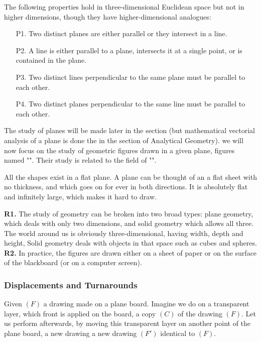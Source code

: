 	The following properties hold in three-dimensional Euclidean space but not in higher dimensions, though they have higher-dimensional analogues:
	\begin{enumerate}
		\item[P1.] Two distinct planes are either parallel or they intersect in a line.
		\item[P2.] A line is either parallel to a plane, intersects it at a single point, or is contained in the plane.
		\item[P3.] Two distinct lines perpendicular to the same plane must be parallel to each other.
		\item[P4.] Two distinct planes perpendicular to the same line must be parallel to each other.
	\end{enumerate}
	
	The study of planes will be made later in the section (but mathematical vectorial analysis of a plane is done the in the section of Analytical Geometry). we will now focus on the study of geometric figures drawn in a given plane, figures named "". Their study is related to the field of "".
	
	All the shapes exist in a flat plane. A plane can be thought of an a flat sheet with no thickness, and which goes on for ever in both directions. It is absolutely flat and infinitely large, which makes it hard to draw.
	
	\begin{tcolorbox}[title=Remarks,colframe=black,arc=10pt]
	\textbf{R1.} The study of geometry can be broken into two broad types: plane geometry, which deals with only two dimensions, and solid geometry which allows all three. The world around us is obviously three-dimensional, having width, depth and height, Solid geometry deals with objects in that space such as cubes and spheres.\\
	
	\textbf{R2.} In practice, the figures are drawn either on a sheet of paper or on the surface of the blackboard (or on a computer screen).
	\end{tcolorbox}
	
	\subsubsection{Displacements and Turnarounds}
	Given $(F)$ a drawing made on a plane board. Imagine we do on a transparent layer, which front  is applied on the board, a copy $(C)$ of the drawing $(F)$. Let us perform afterwards, by moving this transparent layer on another point of the plane board, a new drawing a new drawing $(F ')$ identical to $(F)$.
	
